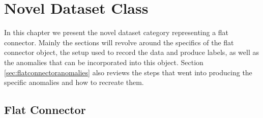\chapter{Novel Dataset Class}
\label{chap:datasets}

In this chapter we present the novel dataset category representing a flat connector. Mainly the sections will revolve around the specifics of the flat connector object, the setup used to 
record the data and produce labels, as well as the anomalies that can be incorporated into this object. Section \ref{sec:flatconnectoranomalies} also reviews the steps that went into producing the specific anomalies 
and how to recreate them.


\section{Flat Connector}
\label{sec:faltconnectordesscription}


